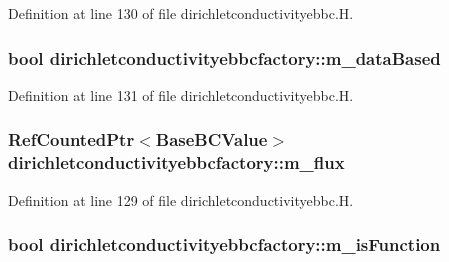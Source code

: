 Definition at line 130 of file dirichletconductivityebbc.\+H.

\subsubsection[{\texorpdfstring{m\+\_\+data\+Based}{m_dataBased}}]{\setlength{\rightskip}{0pt plus 5cm}bool dirichletconductivityebbcfactory\+::m\+\_\+data\+Based\hspace{0.3cm}{\ttfamily [private]}}\hypertarget{classdirichletconductivityebbcfactory_a2838c8447e0579d4ebb080d658fdd2cf}{}\label{classdirichletconductivityebbcfactory_a2838c8447e0579d4ebb080d658fdd2cf}


Definition at line 131 of file dirichletconductivityebbc.\+H.

\subsubsection[{\texorpdfstring{m\+\_\+flux}{m_flux}}]{\setlength{\rightskip}{0pt plus 5cm}Ref\+Counted\+Ptr$<$Base\+B\+C\+Value$>$ dirichletconductivityebbcfactory\+::m\+\_\+flux\hspace{0.3cm}{\ttfamily [private]}}\hypertarget{classdirichletconductivityebbcfactory_a203c4be2676de21b8ba065a5ad23655e}{}\label{classdirichletconductivityebbcfactory_a203c4be2676de21b8ba065a5ad23655e}


Definition at line 129 of file dirichletconductivityebbc.\+H.

\subsubsection[{\texorpdfstring{m\+\_\+is\+Function}{m_isFunction}}]{\setlength{\rightskip}{0pt plus 5cm}bool dirichletconductivityebbcfactory\+::m\+\_\+is\+Function\hspace{0.3cm}{\ttfamily [private]}}\hypertarget{classdirichletconductivityebbcfactory_aa07bdc73058d817faf3b32526657ecee}{}\label{classdirichletconductivityebbcfactory_aa07bdc73058d817faf3b32526657ecee}


